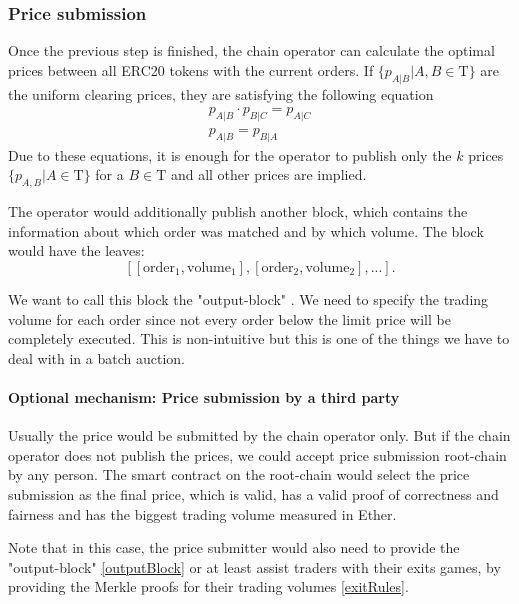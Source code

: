 \documentclass[11pt,parskip=full]{scrartcl}%
\newcommand{\Tau}{\mathrm{T}}
\begin{document}
\subsubsection{Price submission}
Once the previous step is finished, the chain operator can calculate the optimal prices between all ERC20 tokens with the current orders. 
If $\{p_{A|B}| A,B \in \Tau \}$  are the uniform clearing prices, they are satisfying the following equation
\begin{align}
    \label{eq:arbitrage_freeness}
  p_{A|B} \cdot p_{B|C} = p_{A|C}\\
  p_{A|B} = p_{B|A}
\end{align}
Due to these equations, it is enough for the operator to publish only the $k$ prices $\{p_{A,B}| A \in \Tau \}$ for a $B\in \Tau$ and all other prices are implied. 

The operator would additionally publish another block, which contains the information about which order was matched and by which volume. 
The block would have the leaves:
\[[[\text{order}_1, \text{volume}_1], [\text{order}_2, \text{volume}_2],...].\]

We want to call this block the "output-block" \label{outputBlock}. 
We need to specify the trading volume for each order since not every order below the limit price will be completely executed. 
This is non-intuitive but this is one of the things we have to deal with in a batch auction. 
\paragraph{Optional mechanism: Price submission by a third party}
Usually the price would be submitted by the chain operator only. 
But if the chain operator does not publish the prices, we could accept price submission root-chain by any person. 
The smart contract on the root-chain would select the price submission as the final price, which is valid, has a valid proof of correctness and fairness and has the biggest trading volume measured in Ether. 

Note that in this case, the price submitter would also need to provide the "output-block" \ref{outputBlock} or at least assist traders with their exits games, by providing the Merkle proofs for their trading volumes \ref{exitRules}. 
\end{document}
